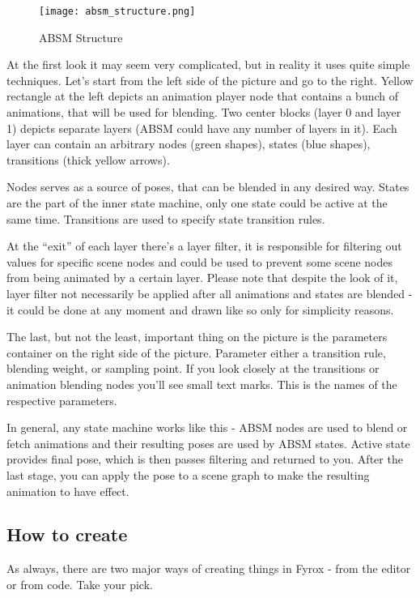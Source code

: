 \documentclass[
]{book}
\theoremstyle{definition}
\theoremstyle{definition}
\theoremstyle{definition}
\theoremstyle{definition}
\theoremstyle{remark}
\begin{document}
\begin{figure}
\centering
\texttt{[image: absm\_structure.png]}
\caption{ABSM Structure}
\end{figure}

At the first look it may seem very complicated, but in reality it uses quite simple techniques. Let's start from the left side of the picture and go to the right. Yellow rectangle at the left depicts an animation player node that contains a bunch of animations, that will be used for blending. Two center blocks (layer 0 and layer 1) depicts separate layers (ABSM could have any number of layers in it). Each layer can contain an arbitrary nodes (green shapes), states (blue shapes), transitions (thick yellow arrows).

Nodes serves as a source of poses, that can be blended in any desired way. States are the part of the inner state machine, only one state could be active at the same time. Transitions are used to specify state transition rules.

At the ``exit'' of each layer there's a layer filter, it is responsible for filtering out values for specific scene nodes and could be used to prevent some scene nodes from being animated by a certain layer. Please note that despite the look of it, layer filter not necessarily be applied after all animations and states are blended - it could be done at any moment and drawn like so only for simplicity reasons.

The last, but not the least, important thing on the picture is the parameters container on the right side of the picture. Parameter either a transition rule, blending weight, or sampling point. If you look closely at the transitions or animation blending nodes you'll see small text marks. This is the names of the respective parameters.

In general, any state machine works like this - ABSM nodes are used to blend or fetch animations and their resulting poses are used by ABSM states. Active state provides final pose, which is then passes filtering and returned to you. After the last stage, you can apply the pose to a scene graph to make the resulting animation to have effect.

\subsection{How to create}\label{how-to-create-14}

As always, there are two major ways of creating things in Fyrox - from the editor or from code. Take your pick.
\end{document}
